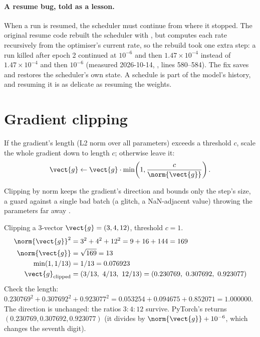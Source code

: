 \paragraph{A resume bug, told as a lesson.} When a run is resumed, the scheduler must continue
from where it stopped. The original resume code rebuilt the scheduler with
, but  computes each rate recursively from the
optimiser's current rate, so the rebuild took one extra step: a run killed after epoch 2
continued at $10^{-6}$ and then $1.47 \times 10^{-4}$ instead of $1.47 \times 10^{-4}$ and then
$10^{-6}$ (measured 2026-10-14, , lines
580--584). The fix saves and restores the scheduler's own state. A schedule is part of the
model's history, and resuming it is as delicate as resuming the weights.

\section{Gradient clipping}\label{sec:trainloop:clip}

\begin{definition}
If the gradient's length (L2 norm over all parameters) exceeds a threshold $c$, scale the whole
gradient down to length $c$; otherwise leave it:
\[
\vect{g} \leftarrow \vect{g}\cdot\min\!\left(1, \frac{c}{\norm{\vect{g}}}\right).
\]
\end{definition}
Clipping by norm keeps the gradient's direction and bounds only the step's size, a guard
against a single bad batch (a glitch, a NaN-adjacent value) throwing the parameters far away
\citep{pascanu2013difficulty}.

\begin{worked}[label={we:trainloop:clip}]{Clipping a 3-vector}
$\vect{g} = (3, 4, 12)$, threshold $c = 1$.
\begin{align*}
\norm{\vect{g}}^2 &= 3^2 + 4^2 + 12^2 = 9 + 16 + 144 = 169\\
\norm{\vect{g}} &= \sqrt{169} = 13\\
\min(1, 1/13) &= 1/13 = 0.076923\\
\vect{g}_{\text{clipped}} &= (3/13,\ 4/13,\ 12/13) = (0.230769,\ 0.307692,\ 0.923077)
\end{align*}
Check the length: $0.230769^2 + 0.307692^2 + 0.923077^2 = 0.053254 + 0.094675 + 0.852071 =
1.000000$. The direction is unchanged: the ratios $3 : 4 : 12$ survive. PyTorch's
 returns $(0.230769, 0.307692, 0.923077)$ \tagC{} (it divides by
$\norm{\vect{g}} + 10^{-6}$, which changes the seventh digit).
\end{worked}

